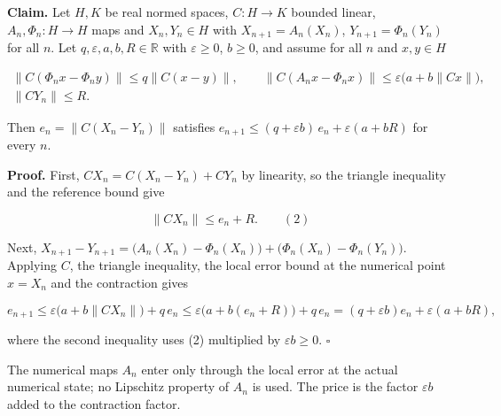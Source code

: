 \documentclass[11pt,a4paper]{report}
\begin{document}
\textbf{Claim.} Let \(H,K\) be real normed spaces, \(C:H\to K\) bounded linear, \(A_n,\Phi_n:H\to H\) maps and \(X_n,Y_n\in H\) with \(X_{n+1}=A_n(X_n)\), \(Y_{n+1}=\Phi_n(Y_n)\) for all \(n\). Let \(q,\varepsilon,a,b,R\in\mathbb R\) with \(\varepsilon\ge0\), \(b\ge0\), and assume for all \(n\) and \(x,y\in H\)


\[\begin{gathered}\|C(\Phi_nx-\Phi_ny)\|\le q\|C(x-y)\|,\qquad\|C(A_nx-\Phi_nx)\|\le\varepsilon\bigl(a+b\|Cx\|\bigr),\\ \|CY_n\|\le R .\end{gathered}\]


Then \(e_n=\|C(X_n-Y_n)\|\) satisfies \(e_{n+1}\le(q+\varepsilon b)\,e_n+\varepsilon(a+bR)\) for every \(n\).




\textbf{Proof.} First, \(CX_n=C(X_n-Y_n)+CY_n\) by linearity, so the triangle inequality and the reference bound give


\[\|CX_n\|\le e_n+R.\qquad(2)\]


Next, \(X_{n+1}-Y_{n+1}=\bigl(A_n(X_n)-\Phi_n(X_n)\bigr)+\bigl(\Phi_n(X_n)-\Phi_n(Y_n)\bigr)\). Applying \(C\), the triangle inequality, the local error bound at the numerical point \(x=X_n\) and the contraction gives


\[e_{n+1}\le\varepsilon\bigl(a+b\|CX_n\|\bigr)+q\,e_n\le\varepsilon\bigl(a+b(e_n+R)\bigr)+q\,e_n=(q+\varepsilon b)e_n+\varepsilon(a+bR),\]


where the second inequality uses (2) multiplied by \(\varepsilon b\ge0\). \(\square\)




The numerical maps \(A_n\) enter only through the local error at the actual numerical state; no Lipschitz property of \(A_n\) is used. The price is the factor \(\varepsilon b\) added to the contraction factor.
\end{document}
